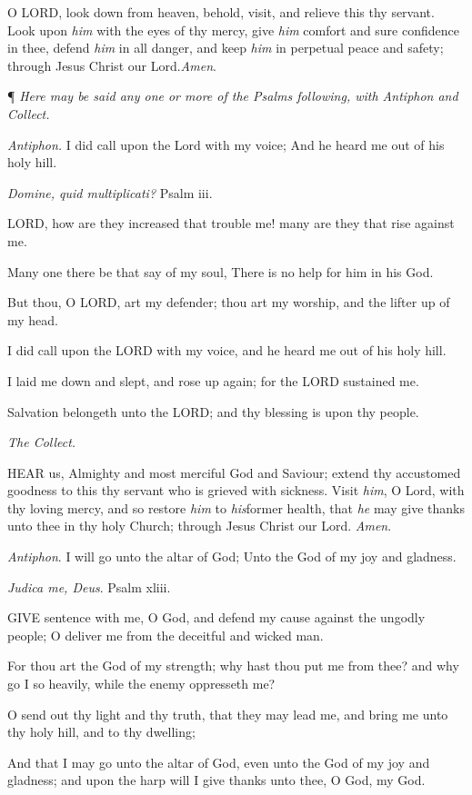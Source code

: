 O LORD, look down from
heaven, behold, visit, and relieve this thy servant. Look upon \emph{him}
with the eyes of thy mercy, give \emph{him} comfort and sure confidence
in thee, defend \emph{him} in all danger, and keep \emph{him} in perpetual
peace and safety; through Jesus Christ our Lord.\emph{Amen}.

¶ \emph{Here may be said
any one or more of the Psalms following, with Antiphon and Collect.}

\emph{Antiphon.} I did call upon
the Lord with my voice; And he heard me out of his holy hill.

\emph{Domine, quid multiplicati?} Psalm iii.

LORD, how are they increased
that trouble me! many are they that rise against me.

Many one there be that say of my soul, There is no
help for him in his God.

But thou, O LORD, art my defender;
thou art my worship, and the lifter up of my head.

I did call upon the LORD with
my voice, and he heard me out of his holy hill.

I laid me down and slept, and rose up again; for the
LORD sustained me.

Salvation belongeth unto the LORD;
and thy blessing is upon thy people.

\emph{The Collect.}

HEAR us, Almighty and most
merciful God and Saviour; extend thy accustomed goodness to this thy servant
who is grieved with sickness. Visit \emph{him}, O Lord, with thy loving
mercy, and so restore \emph{him} to \emph{his}former health, that
\emph{he} may give thanks unto thee in thy holy Church; through Jesus
Christ our Lord. \emph{Amen}.

\emph{Antiphon}. I will go unto the altar of God; Unto the God of my
joy and gladness.

\emph{Judica
me, Deus}. Psalm xliii.

GIVE
sentence with me, O God, and defend my cause against the ungodly people;
O deliver me from the deceitful and wicked man.

For thou art the God of my strength; why hast thou
put me from thee? and why go I so heavily, while the enemy oppresseth
me?

O send out thy light and thy truth, that they may
lead me, and bring me unto thy holy hill, and to thy dwelling;

And that I may go unto the altar of God, even unto
the God of my joy and gladness; and upon the harp will I give thanks
unto thee, O God, my God.

